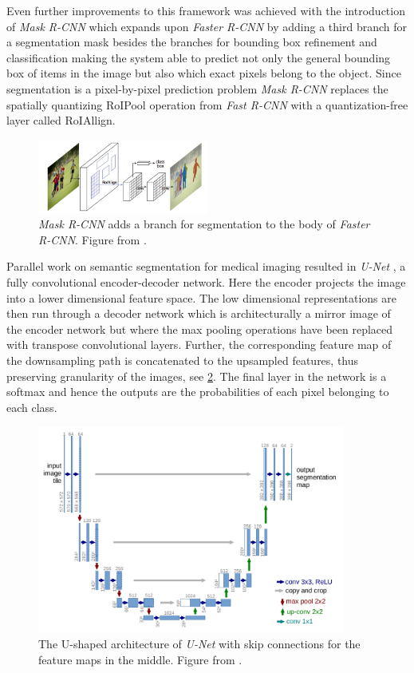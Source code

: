 \documentclass{kththesis}
\newcommand{\bibentry}[1]{\parencite{#1}}
\begin{document}
Even further improvements to this
framework was achieved with the introduction of \emph{Mask R-CNN}
\bibentry{he2017mask} which expands upon \emph{Faster R-CNN} by adding a third
branch for a segmentation mask besides the branches for bounding box refinement
and classification making the system able to predict not only the general
bounding box of items in the image but also which exact pixels belong to the
object. Since segmentation is a pixel-by-pixel prediction problem \emph{Mask
  R-CNN} replaces the spatially quantizing RoIPool operation from \emph{Fast
  R-CNN} with a quantization-free layer called RoIAllign. 

\begin{figure}[h]
  \centering
  \includegraphics[width=0.5\textwidth]{MaskR-CNN}
  \caption{\textit{Mask R-CNN} adds a branch for segmentation to the body of
    \textit{Faster R-CNN}. Figure from \textcite[]{he2017mask}.}
  \label{fig:AlexNet}
  \end{figure}

Parallel work on semantic segmentation for medical imaging resulted in
\emph{U-Net} \parencite[]{UNet}, a fully convolutional encoder-decoder network.
Here the encoder projects the image into a lower dimensional feature space.
The low dimensional representations are then run through a decoder
network which is architecturally a mirror image of the encoder network but where
the max pooling operations have been replaced with transpose convolutional
layers. Further, the corresponding feature map of the downsampling path is
concatenated to the upsampled features, thus preserving
granularity of the images, see \cref{fig:UNet}. The final layer in the network is a softmax and hence
the outputs are the probabilities of each pixel belonging to each class.
\begin{figure}[h]
  \centering
  \includegraphics[width=0.9\textwidth]{U-Net}
  \caption{The U-shaped architecture of \textit{U-Net} with skip connections for
    the feature maps in the middle. Figure from \textcite[]{UNet}.}
  \label{fig:UNet}
  \end{figure}
\end{document}
